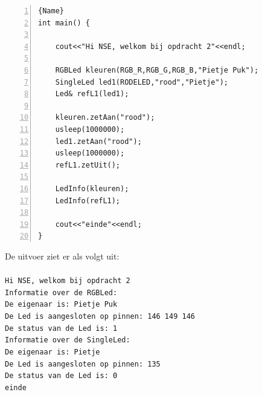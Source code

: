 \begin{enumerate}[label=(\alph*)]
\begin{lstlisting}[caption=main functie om de klasse SingleLed te testen. ,frame=trbl,firstnumber=1,numbers=left,label={lst:mainCombi}]{Name}
int main() {
	
	cout<<"Hi NSE, welkom bij opdracht 2"<<endl;
	
	RGBLed kleuren(RGB_R,RGB_G,RGB_B,"Pietje Puk");
	SingleLed led1(RODELED,"rood","Pietje");
	Led& refL1(led1);
	
	kleuren.zetAan("rood");
	usleep(1000000);
	led1.zetAan("rood");
	usleep(1000000);
	refL1.zetUit();
	
	LedInfo(kleuren);
	LedInfo(refL1);
	
	cout<<"einde"<<endl;
}	
\end{lstlisting}	
De uitvoer ziet er als volgt uit:\\\\
\texttt{Hi NSE, welkom bij opdracht 2\\
Informatie over de RGBLed:\\
De eigenaar is: Pietje Puk\\
De Led is aangesloten op pinnen: 146 149 146\\
De status van de Led is: 1\\
Informatie over de SingleLed:\\
De eigenaar is: Pietje\\
De Led is aangesloten op pinnen: 135\\
De status van de Led is: 0\\
einde}


\end{enumerate}

